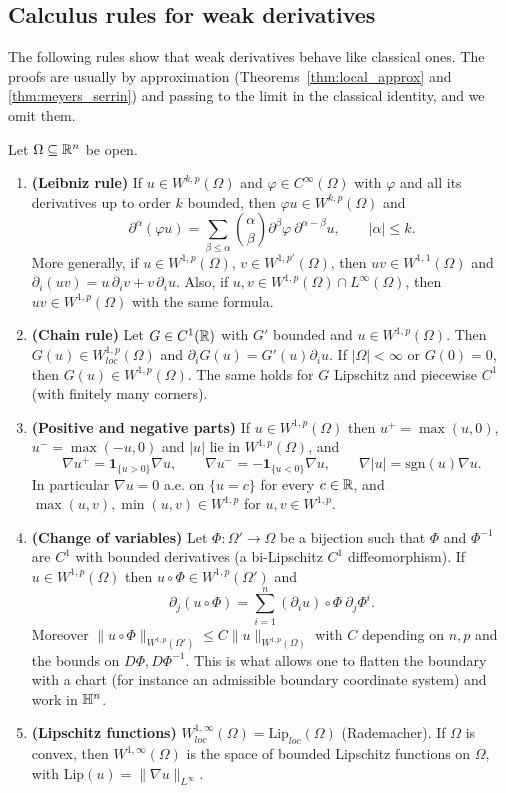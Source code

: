 \subsection{Calculus rules for weak derivatives}
The following rules show that weak derivatives behave like classical ones. The proofs are usually by approximation (Theorems~\ref{thm:local_approx} and \ref{thm:meyers_serrin}) and passing to the limit in the classical identity, and we omit them.
\begin{theorem}\label{thm:calculus_rules}
Let $\Omega\subseteq\mathbb{R}^n$ be open.
\begin{enumerate}
    \item \textbf{(Leibniz rule)} If $u\in W^{k,p}(\Omega)$ and $\varphi\in C^\infty(\Omega)$ with $\varphi$ and all its derivatives up to order $k$ bounded, then $\varphi u\in W^{k,p}(\Omega)$ and
    $$\partial^\alpha(\varphi u)=\sum_{\beta\leq\alpha}\binom{\alpha}{\beta}\partial^\beta\varphi\ \partial^{\alpha-\beta}u,\qquad |\alpha|\leq k.$$
    More generally, if $u\in W^{1,p}(\Omega)$, $v\in W^{1,p'}(\Omega)$, then $uv\in W^{1,1}(\Omega)$ and $\partial_i(uv)=u\,\partial_iv+v\,\partial_iu$. Also, if $u,v\in W^{1,p}(\Omega)\cap L^\infty(\Omega)$, then $uv\in W^{1,p}(\Omega)$ with the same formula.
    \item \textbf{(Chain rule)} Let $G\in C^1(\mathbb{R})$ with $G'$ bounded and $u\in W^{1,p}(\Omega)$. Then $G(u)\in W^{1,p}_{loc}(\Omega)$ and $\partial_iG(u)=G'(u)\partial_iu$. If $|\Omega|<\infty$ or $G(0)=0$, then $G(u)\in W^{1,p}(\Omega)$. The same holds for $G$ Lipschitz and piecewise $C^1$ (with finitely many corners).
    \item \textbf{(Positive and negative parts)} If $u\in W^{1,p}(\Omega)$ then $u^+=\max(u,0)$, $u^-=\max(-u,0)$ and $|u|$ lie in $W^{1,p}(\Omega)$, and
    $$\nabla u^+=\mathbf 1_{\{u>0\}}\nabla u,\qquad\nabla u^-=-\mathbf 1_{\{u<0\}}\nabla u,\qquad\nabla|u|=\mathrm{sgn}(u)\nabla u.$$
    In particular $\nabla u=0$ a.e. on $\{u=c\}$ for every $c\in\mathbb{R}$, and $\max(u,v),\min(u,v)\in W^{1,p}$ for $u,v\in W^{1,p}$.
    \item \textbf{(Change of variables)} Let $\Phi:\Omega'\to\Omega$ be a bijection such that $\Phi$ and $\Phi^{-1}$ are $C^1$ with bounded derivatives (a bi-Lipschitz $C^1$ diffeomorphism). If $u\in W^{1,p}(\Omega)$ then $u\circ\Phi\in W^{1,p}(\Omega')$ and
    $$\partial_j(u\circ\Phi)=\sum_{i=1}^n(\partial_iu)\circ\Phi\ \partial_j\Phi^i.$$
    Moreover $\|u\circ\Phi\|_{W^{1,p}(\Omega')}\leq C\|u\|_{W^{1,p}(\Omega)}$ with $C$ depending on $n,p$ and the bounds on $D\Phi,D\Phi^{-1}$. This is what allows one to flatten the boundary with a chart (for instance an admissible boundary coordinate system) and work in $\mathbb{H}^n$.
    \item \textbf{(Lipschitz functions)} $W^{1,\infty}_{loc}(\Omega)=\mathrm{Lip}_{loc}(\Omega)$ (Rademacher). If $\Omega$ is convex, then $W^{1,\infty}(\Omega)$ is the space of bounded Lipschitz functions on $\Omega$, with $\mathrm{Lip}(u)=\|\nabla u\|_{L^\infty}$.
\end{enumerate}
\end{theorem}
